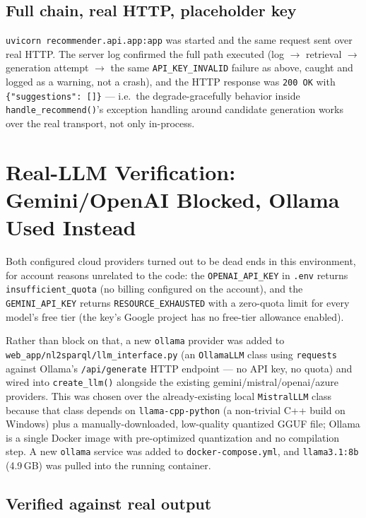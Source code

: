\documentclass[11pt,a4paper]{article}
\newcommand{\code}[1]{\texttt{#1}}
\begin{document}
\subsection{Full chain, real HTTP, placeholder key}

\code{uvicorn recommender.api.app:app} was started and the same request sent over real HTTP. The
server log confirmed the full path executed (log $\to$ retrieval $\to$ generation attempt $\to$ the
same \code{API\_KEY\_INVALID} failure as above, caught and logged as a warning, not a crash), and
the HTTP response was \code{200 OK} with \code{\{"suggestions": []\}} --- i.e.\ the
degrade-gracefully behavior inside \code{handle\_recommend()}'s exception handling around candidate
generation works over the real transport, not only in-process.

\newpage
\section{Real-LLM Verification: Gemini/OpenAI Blocked, Ollama Used Instead}
\label{sec:ollama}

Both configured cloud providers turned out to be dead ends in this environment, for account
reasons unrelated to the code: the \code{OPENAI\_API\_KEY} in \code{.env} returns
\code{insufficient\_quota} (no billing configured on the account), and the \code{GEMINI\_API\_KEY}
returns \code{RESOURCE\_EXHAUSTED} with a zero-quota limit for every model's free tier (the key's
Google project has no free-tier allowance enabled).

Rather than block on that, a new \code{ollama} provider was added to
\code{web\_app/nl2sparql/llm\_interface.py} (an \code{OllamaLLM} class using \code{requests}
against Ollama's \code{/api/generate} HTTP endpoint --- no API key, no quota) and wired into
\code{create\_llm()} alongside the existing gemini/mistral/openai/azure providers. This was chosen
over the already-existing local \code{MistralLLM} class because that class depends on
\code{llama-cpp-python} (a non-trivial C++ build on Windows) plus a manually-downloaded, low-quality
quantized GGUF file; Ollama is a single Docker image with pre-optimized quantization and no
compilation step. A new \code{ollama} service was added to \code{docker-compose.yml}, and
\code{llama3.1:8b} (4.9\,GB) was pulled into the running container.

\subsection{Verified against real output}
\end{document}
